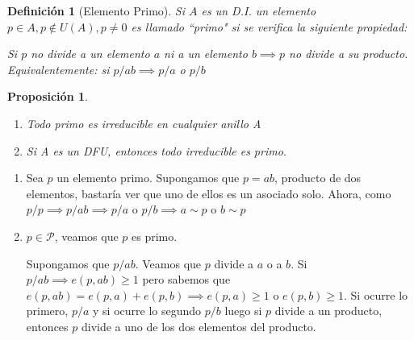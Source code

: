 \documentclass[11pt, a4paper, titlepage]{article}
\makeatletter
\newif\IfInSansMode
\let\oldsf\sffamily
\renewcommand*{\sffamily}{\oldsf\mathversion{sans}\InSansModetrue}
\let\oldnorm\normalfont
\renewcommand*{\normalfont}{\oldnorm\InSansModefalse\mathversion{normal}}
\renewenvironment{proof}[1][\proofname] {\vspace{-15pt}\par\pushQED{\qed}\normalfont\topsep6\p@\@plus6\p@\relax\trivlist\item[\hskip\labelsep\it#1\@addpunct{.}]\ignorespaces}{\popQED\endtrivlist\@endpefalse}
\renewenvironment{proof}[1][\proofname] {\par\pushQED{\qed}\normalfont\topsep6\p@\@plus6\p@\relax\trivlist\item[\hskip\labelsep\itshape\sffamily#1\@addpunct{.}]\ignorespaces}{\popQED\endtrivlist\@endpefalse}
\theoremstyle{theorem-style}
\newtheorem{nprop}{Proposición}[section]
\theoremstyle{definition-style}
\newtheorem{ndef}{Definición}[section]
\theoremstyle{remark-style}
\theoremstyle{example-style}
\newenvironment{nlist}
{\begin{enumerate}
\renewcommand\labelenumi{(\emph{\roman{enumi})}}}
{\end{enumerate}}
\makeatother
\begin{document}
\begin{ndef}[Elemento Primo]
	Si $A$ es un D.I. un elemento $p\in A , p \notin U(A), p \ne 0$ es llamado “primo" si se verifica la siguiente propiedad:

	Si $p$ no divide a un elemento $a$ ni a un elemento $b \implies p$ no divide a su producto.\\
	Equivalentemente: si $p/ab \implies p/a$ o $p/b$

\end{ndef}

\begin{nprop}
\begin{nlist}
	\item Todo primo es irreducible en cualquier anillo A
	\item Si A es un DFU, entonces todo irreducible es primo.
\end{nlist}
\end{nprop}
\begin{proof}
	\begin{nlist}
	\item Sea $p$ un elemento primo. Supongamos que $p=ab$, producto de dos elementos, bastaría ver que uno de ellos es un asociado solo. Ahora, como $p/p \implies p/ab \implies  p/a $ o $p/b \implies a \sim p$ o $b \sim p$

	\item $p \in \mathcal{P}$, veamos que $p$ es primo.

Supongamos que $p/ab$. Veamos que $p$ divide a $a$ o a $b$.
Si $p/ab\implies e(p,ab) \geq 1$ pero sabemos que $e(p,ab) = e(p,a)+e(p,b) \implies e(p,a) \geq 1$ o $e(p,b) \geq 1$. Si ocurre lo primero, $p/a$ y si ocurre lo segundo $p/b$ luego si $p$ divide a un producto, entonces $p$ divide a uno de los dos elementos del producto.
\end{nlist}
\end{proof}
\end{document}
